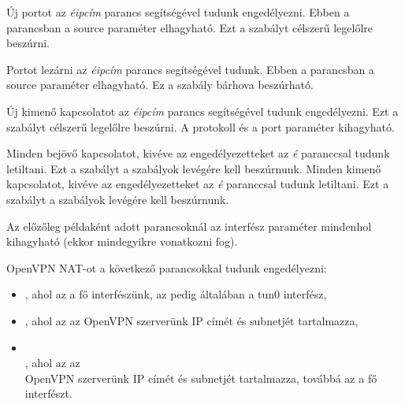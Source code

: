 Új portot az \textit{éipcím} parancs segítségével tudunk engedélyezni. Ebben a parancsban a source paraméter elhagyható. Ezt a szabályt célszerű legelőlre beszúrni.

Portot lezárni az \textit{éipcím} parancs segítségével tudunk. Ebben a parancsban a source paraméter elhagyható. Ez a szabály bárhova beszúrható.

Új kimenő kapcsolatot az \textit{éipcím} parancs segítségével tudunk engedélyezni. Ezt a szabályt célszerű legelőlre beszúrni. A protokoll és a port paraméter kihagyható.

Minden bejövő kapcsolatot, kivéve az engedélyezetteket az \textit{é} paranccsal tudunk letiltani. Ezt a szabályt a szabályok levégére kell beszúrnunk.
Minden kimenő kapcsolatot, kivéve az engedélyezetteket az \textit{é} paranccsal tudunk letiltani. Ezt a szabályt a szabályok levégére kell beszúrnunk.

Az előzőleg példaként adott parancsoknál az interfész paraméter mindenhol kihagyható (ekkor mindegyikre vonatkozni fog).

OpenVPN NAT-ot a következő parancsokkal tudunk engedélyezni:
\begin{itemize}
	\item {}, ahol az  a fő interfészünk, az  pedig általában a tun0 interfész,
	\item {}, ahol az  az OpenVPN szerverünk IP címét és subnetjét tartalmazza,
	\item {}\\, ahol az  az \\OpenVPN szerverünk IP címét és subnetjét tartalmazza, továbbá az  a fő interfészt.
\end{itemize}


